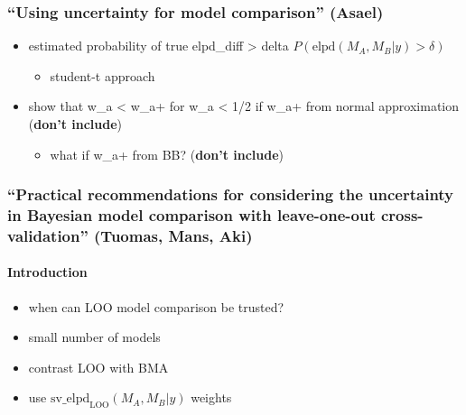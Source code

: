 \hypertarget{using-uncertainty-for-model-comparison-asael}{%
\subsubsection{``Using uncertainty for model comparison''
(Asael)}\label{using-uncertainty-for-model-comparison-asael}}

\begin{itemize}
\tightlist
\item
  estimated probability of true elpd\_diff \textgreater{} delta
  \(P(\mathrm{elpd}(M_A, M_B | y) > \delta)\)

  \begin{itemize}
  \tightlist
  \item
    student-t approach
  \end{itemize}
\item
  show that w\_a \textless{} w\_a+ for w\_a \textless{} 1/2 if w\_a+
  from normal approximation (\textbf{don't include})

  \begin{itemize}
  \tightlist
  \item
    what if w\_a+ from BB? (\textbf{don't include})
  \end{itemize}
\end{itemize}

\hypertarget{practical-recommendations-for-considering-the-uncertainty-in-bayesian-model-comparison-with-leave-one-out-cross-validation-tuomas-mans-aki}{%
\subsubsection{``Practical recommendations for considering the
uncertainty in Bayesian model comparison with leave-one-out
cross-validation'' (Tuomas, Mans,
Aki)}\label{practical-recommendations-for-considering-the-uncertainty-in-bayesian-model-comparison-with-leave-one-out-cross-validation-tuomas-mans-aki}}

\hypertarget{introduction-1}{%
\paragraph{Introduction}\label{introduction-1}}

\begin{itemize}
\tightlist
\item
  when can LOO model comparison be trusted?
\item
  small number of models
\item
  contrast LOO with BMA
\item
  use \(\mathrm{sv\_elpd}_\mathrm{LOO}(M_A, M_B | y)\) weights
\end{itemize}

